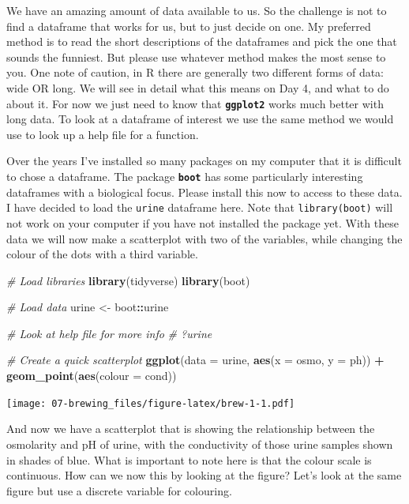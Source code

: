 \documentclass[
]{book}
\newenvironment{Shaded}{\begin{snugshade}}{\end{snugshade}}
\newcommand{\CommentTok}[1]{\textcolor[rgb]{0.56,0.35,0.01}{\textit{#1}}}
\newcommand{\DataTypeTok}[1]{\textcolor[rgb]{0.13,0.29,0.53}{#1}}
\newcommand{\KeywordTok}[1]{\textcolor[rgb]{0.13,0.29,0.53}{\textbf{#1}}}
\newcommand{\NormalTok}[1]{#1}
\newcommand{\OperatorTok}[1]{\textcolor[rgb]{0.81,0.36,0.00}{\textbf{#1}}}
\newcommand{\StringTok}[1]{\textcolor[rgb]{0.31,0.60,0.02}{#1}}
\begin{document}
We have an amazing amount of data available to us. So the challenge is not to find a dataframe that works for us, but to just decide on one. My preferred method is to read the short descriptions of the dataframes and pick the one that sounds the funniest. But please use whatever method makes the most sense to you. One note of caution, in R there are generally two different forms of data: wide OR long. We will see in detail what this means on Day 4, and what to do about it. For now we just need to know that \textbf{\texttt{ggplot2}} works much better with long data. To look at a dataframe of interest we use the same method we would use to look up a help file for a function.

Over the years I've installed so many packages on my computer that it is difficult to chose a dataframe. The package \textbf{\texttt{boot}} has some particularly interesting dataframes with a biological focus. Please install this now to access to these data. I have decided to load the \texttt{urine} dataframe here. Note that \texttt{library(boot)} will not work on your computer if you have not installed the package yet. With these data we will now make a scatterplot with two of the variables, while changing the colour of the dots with a third variable.

\begin{Shaded}
\begin{Highlighting}[]
\CommentTok{\# Load libraries}
\KeywordTok{library}\NormalTok{(tidyverse)}
\KeywordTok{library}\NormalTok{(boot)}

\CommentTok{\# Load data}
\NormalTok{urine <{-}}\StringTok{ }\NormalTok{boot}\OperatorTok{::}\NormalTok{urine}

\CommentTok{\# Look at help file for more info}
\CommentTok{\# ?urine}

\CommentTok{\# Create a quick scatterplot}
\KeywordTok{ggplot}\NormalTok{(}\DataTypeTok{data =}\NormalTok{ urine, }\KeywordTok{aes}\NormalTok{(}\DataTypeTok{x =}\NormalTok{ osmo, }\DataTypeTok{y =}\NormalTok{ ph)) }\OperatorTok{+}
\StringTok{  }\KeywordTok{geom\_point}\NormalTok{(}\KeywordTok{aes}\NormalTok{(}\DataTypeTok{colour =}\NormalTok{ cond))}
\end{Highlighting}
\end{Shaded}

\texttt{[image: 07-brewing\_files/figure-latex/brew-1-1.pdf]}

And now we have a scatterplot that is showing the relationship between the osmolarity and pH of urine, with the conductivity of those urine samples shown in shades of blue. What is important to note here is that the colour scale is continuous. How can we now this by looking at the figure? Let's look at the same figure but use a discrete variable for colouring.
\end{document}

